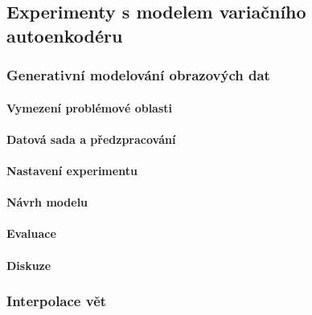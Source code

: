 \documentclass[11pt,a4paper]{report}
\begin{document}
\chapter{Experimenty s modelem variačního autoenkodéru}
\section{Generativní modelování obrazových dat}
\subsection{Vymezení problémové oblasti}
\subsection{Datová sada a předzpracování}
\subsection{Nastavení experimentu}
\subsection{Návrh modelu}
\subsection{Evaluace}
\subsection{Diskuze}
\section{Interpolace vět}

{%
\pagestyle{plain}

}




\part*{\Prilohy\thispagestyle{empty}}
\appendix

% 
% 
\end{document}
